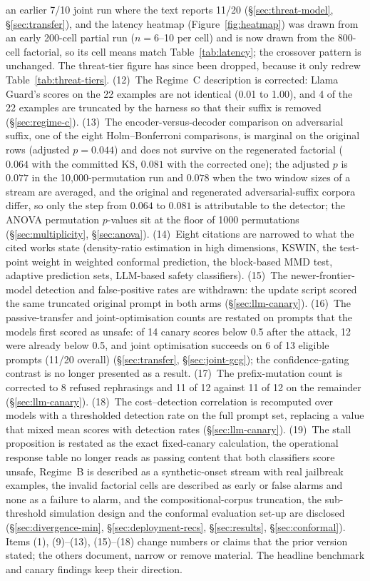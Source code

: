\documentclass{article}
\begin{document}
an earlier 7/10 joint run where the text reports 11/20 (\S\ref{sec:threat-model}, \S\ref{sec:transfer}), and the latency heatmap (Figure~\ref{fig:heatmap}) was drawn from an early 200-cell partial run ($n{=}6$--10 per cell) and is now drawn from the 800-cell factorial, so its cell means match Table~\ref{tab:latency}; the crossover pattern is unchanged. The threat-tier figure has since been dropped, because it only redrew Table~\ref{tab:threat-tiers}. (12)~The Regime~C description is corrected: Llama Guard's scores on the 22 examples are not identical (0.01 to 1.00), and 4 of the 22 examples are truncated by the harness so that their suffix is removed (\S\ref{sec:regime-c}). (13)~The encoder-versus-decoder comparison on adversarial suffix, one of the eight Holm--Bonferroni comparisons, is marginal on the original rows (adjusted $p=0.044$) and does not survive on the regenerated factorial ($0.064$ with the committed KS, $0.081$ with the corrected one); the adjusted $p$ is $0.077$ in the 10{,}000-permutation run and $0.078$ when the two window sizes of a stream are averaged, and the original and regenerated adversarial-suffix corpora differ, so only the step from $0.064$ to $0.081$ is attributable to the detector; the ANOVA permutation $p$-values sit at the floor of 1000 permutations (\S\ref{sec:multiplicity}, \S\ref{sec:anova}). (14)~Eight citations are narrowed to what the cited works state (density-ratio estimation in high dimensions, KSWIN, the test-point weight in weighted conformal prediction, the block-based MMD test, adaptive prediction sets, LLM-based safety classifiers). (15)~The newer-frontier-model detection and false-positive rates are withdrawn: the update script scored the same truncated original prompt in both arms (\S\ref{sec:llm-canary}). (16)~The passive-transfer and joint-optimisation counts are restated on prompts that the models first scored as unsafe: of 14 canary scores below 0.5 after the attack, 12 were already below 0.5, and joint optimisation succeeds on 6 of 13 eligible prompts (11/20 overall) (\S\ref{sec:transfer}, \S\ref{sec:joint-gcg}); the confidence-gating contrast is no longer presented as a result. (17)~The prefix-mutation count is corrected to 8 refused rephrasings and 11 of 12 against 11 of 12 on the remainder (\S\ref{sec:llm-canary}). (18)~The cost--detection correlation is recomputed over models with a thresholded detection rate on the full prompt set, replacing a value that mixed mean scores with detection rates (\S\ref{sec:llm-canary}). (19)~The stall proposition is restated as the exact fixed-canary calculation, the operational response table no longer reads as passing content that both classifiers score unsafe, Regime~B is described as a synthetic-onset stream with real jailbreak examples, the invalid factorial cells are described as early or false alarms and none as a failure to alarm, and the compositional-corpus truncation, the sub-threshold simulation design and the conformal evaluation set-up are disclosed (\S\ref{sec:divergence-min}, \S\ref{sec:deployment-recs}, \S\ref{sec:results}, \S\ref{sec:conformal}). Items (1), (9)--(13), (15)--(18) change numbers or claims that the prior version stated; the others document, narrow or remove material. The headline benchmark and canary findings keep their direction.
\end{document}
